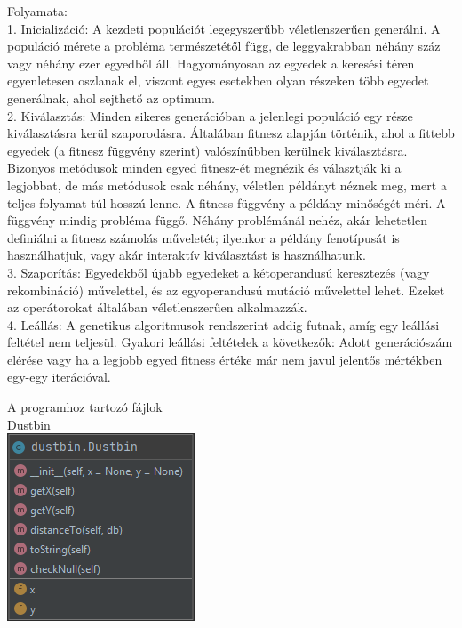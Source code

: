 Folyamata: \\

1. Inicializáció: A kezdeti populációt legegyszerűbb véletlenszerűen generálni. A populáció mérete a probléma természetétől függ, de leggyakrabban néhány száz vagy néhány ezer egyedből áll. Hagyományosan az egyedek a keresési téren egyenletesen oszlanak el, viszont egyes esetekben olyan részeken több egyedet generálnak, ahol sejthető az optimum. \\

2. Kiválasztás: Minden sikeres generációban a jelenlegi populáció egy része kiválasztásra kerül szaporodásra. Általában fitnesz alapján történik, ahol a fittebb egyedek (a fitnesz függvény szerint) valószínűbben kerülnek kiválasztásra. Bizonyos metódusok minden egyed fitnesz-ét megnézik és választják ki a legjobbat, de más metódusok csak néhány, véletlen példányt néznek meg, mert a teljes folyamat túl hosszú lenne. A fitness függvény a példány minőségét méri. A függvény mindig probléma függő. Néhány problémánál nehéz, akár lehetetlen definiálni a fitnesz számolás műveletét; ilyenkor a példány fenotípusát is használhatjuk, vagy akár interaktív kiválasztást is használhatunk. \\

3. Szaporítás: Egyedekből újabb egyedeket a kétoperandusú keresztezés (vagy rekombináció) művelettel, és az egyoperandusú mutáció művelettel lehet. Ezeket az operátorokat általában véletlenszerűen alkalmazzák. \\

4. Leállás: A genetikus algoritmusok rendszerint addig futnak, amíg egy leállási feltétel nem teljesül. Gyakori leállási feltételek a következők: Adott generációszám elérése vagy ha a legjobb egyed fitness értéke már nem javul jelentős mértékben egy-egy iterációval.\\



A programhoz tartozó fájlok\\

Dustbin\\

\includegraphics[scale=0.8]{images/dustbin.png}

